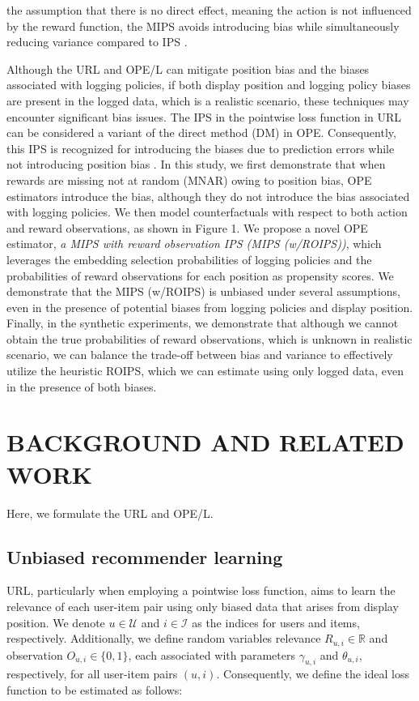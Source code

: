 \documentclass[a4paper,10pt]{article} %
\begin{document}
\begin{multicols}{2}
\noindent
the assumption that there is no direct effect, meaning the action is not influenced by the reward function, the MIPS avoids introducing bias while simultaneously reducing variance compared to IPS \cite{saito2022off}. 

Although the URL and OPE/L can mitigate position bias and the biases associated with logging policies, if both display position and logging policy biases are present in the logged data, which is a realistic scenario, these techniques may encounter significant bias issues. The IPS in the pointwise loss function in URL can be considered a variant of the direct method (DM) in OPE. Consequently, this IPS is recognized for introducing the biases due to prediction errors while not introducing position bias \cite{saito2022off}. In this study, we first demonstrate that when rewards are missing not at random (MNAR) owing to position bias, OPE estimators introduce the bias, although they do not introduce the bias associated with logging policies. We then model counterfactuals with respect to both action and reward observations, as shown in Figure 1. We propose a novel OPE estimator, \textit{a MIPS with reward observation IPS (MIPS (w/ROIPS))}, which leverages the embedding selection probabilities of logging policies and the probabilities of reward observations for each position as propensity scores. We demonstrate that the MIPS (w/ROIPS) is unbiased under several assumptions, even in the presence of potential biases from logging policies and display position. Finally, in the synthetic experiments, we demonstrate that although we cannot obtain the true probabilities of reward observations, which is unknown in realistic scenario, we can balance the trade-off between bias and variance to effectively utilize the heuristic ROIPS, which we can estimate using only logged data, even in the presence of both biases.

\section{BACKGROUND AND RELATED WORK}
Here, we formulate the URL and OPE/L.

\subsection{Unbiased recommender learning}
URL, particularly when employing a pointwise loss function, aims to learn the relevance of each user-item pair using only biased data that arises from display position. We denote \( u \in \mathcal{U} \) and \( i \in \mathcal{I} \) as the indices for users and items, respectively. Additionally, we define random variables relevance \( R_{u,i} \in \mathbb{R} \) and observation \( O_{u,i} \in \{ 0, 1 \} \), each associated with parameters \( \gamma_{u,i} \) and \( \theta_{u,i} \), respectively, for all user-item pairs \( (u,i) \). Consequently, we define the ideal loss function to be estimated as follows:


\end{multicols}
\end{document}
